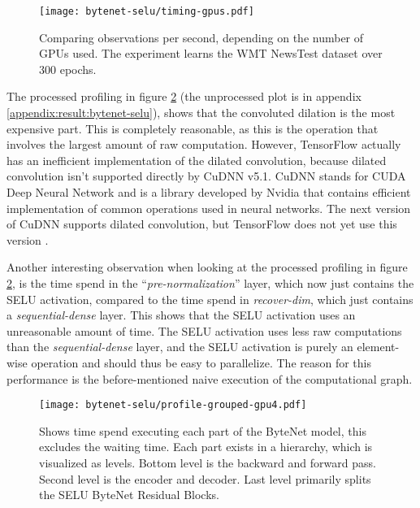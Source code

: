 \begin{figure}[h]
    \centering
    \texttt{[image: bytenet-selu/timing-gpus.pdf]}
    \caption{Comparing observations per second, depending on the number of GPUs used. The experiment learns the WMT NewsTest dataset over 300 epochs.}
    \label{fig:result:selu-bytenet:timing-gpus}
\end{figure}

The processed profiling in figure \ref{fig:result:selu-bytenet:profile-grouped} (the unprocessed plot is in appendix \ref{appendix:result:bytenet-selu}), shows that the convoluted dilation is the most expensive part. This is completely reasonable, as this is the operation that involves the largest amount of raw computation. However, TensorFlow actually has an inefficient implementation of the dilated convolution, because dilated convolution isn't supported directly by CuDNN v5.1. CuDNN stands for CUDA Deep Neural Network and is a library developed by Nvidia that contains efficient implementation of common operations used in neural networks. The next version of CuDNN supports dilated convolution, but TensorFlow does not yet use this version \cite{nvidia-cudnn}.

Another interesting observation when looking at the processed profiling in figure \ref{fig:result:selu-bytenet:profile-grouped}, is the time spend in the ``\textit{pre-normalization}'' layer, which now just contains the SELU activation, compared to the time spend in \textit{recover-dim}, which just contains a \textit{sequential-dense} layer. This shows that the SELU activation uses an unreasonable amount of time. The SELU activation uses less raw computations than the \textit{sequential-dense} layer, and the SELU activation is purely an element-wise operation and should thus be easy to parallelize. The reason for this performance is the before-mentioned naive execution of the computational graph.

\begin{figure}[h]
    \centering
    \texttt{[image: bytenet-selu/profile-grouped-gpu4.pdf]}
    \caption{Shows time spend executing each part of the ByteNet model, this excludes the waiting time. Each part exists in a hierarchy, which is visualized as levels. Bottom level is the backward and forward pass. Second level is the encoder and decoder. Last level primarily splits the SELU ByteNet Residual Blocks.}
    \label{fig:result:selu-bytenet:profile-grouped}
\end{figure}

\clearpage
